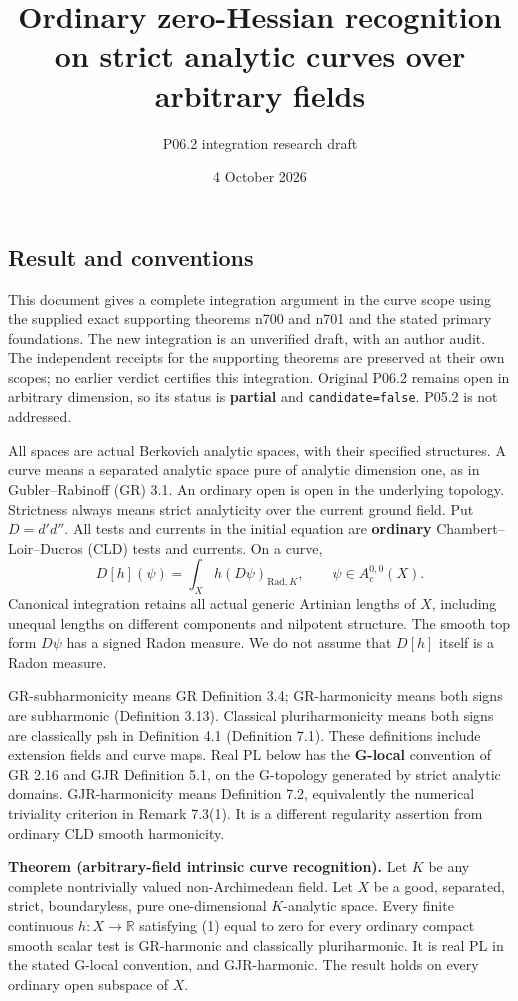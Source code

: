 \documentclass[
  11pt,
]{article}
\title{Ordinary zero-Hessian recognition on strict analytic curves over
arbitrary fields}
\author{P06.2 integration research draft}
\date{4 October 2026}
\begin{document}
\maketitle

\subsection{Result and conventions}\label{result-and-conventions}

This document gives a complete integration argument in the curve scope
using the supplied exact supporting theorems n700 and n701 and the
stated primary foundations. The new integration is an unverified draft,
with an author audit. The independent receipts for the supporting
theorems are preserved at their own scopes; no earlier verdict certifies
this integration. Original P06.2 remains open in arbitrary dimension, so
its status is \textbf{partial} and \texttt{candidate=false}. P05.2 is
not addressed.

All spaces are actual Berkovich analytic spaces, with their specified
structures. A curve means a separated analytic space pure of analytic
dimension one, as in Gubler--Rabinoff (GR) 3.1. An ordinary open is open
in the underlying topology. Strictness always means strict analyticity
over the current ground field. Put \(D=d'd''\). All tests and currents
in the initial equation are \textbf{ordinary} Chambert--Loir--Ducros
(CLD) tests and currents. On a curve, \[
 D[h](\psi)=\int_X h(D\psi)_{\mathrm{Rad},K},
 \qquad \psi\in A_c^{0,0}(X).                         \tag{1}
\] Canonical integration retains all actual generic Artinian lengths of
\(X\), including unequal lengths on different components and nilpotent
structure. The smooth top form \(D\psi\) has a signed Radon measure. We
do not assume that \(D[h]\) itself is a Radon measure.

GR-subharmonicity means GR Definition 3.4; GR-harmonicity means both
signs are subharmonic (Definition 3.13). Classical pluriharmonicity
means both signs are classically psh in Definition 4.1 (Definition 7.1).
These definitions include extension fields and curve maps. Real PL below
has the \textbf{G-local} convention of GR 2.16 and GJR Definition 5.1,
on the G-topology generated by strict analytic domains. GJR-harmonicity
means Definition 7.2, equivalently the numerical triviality criterion in
Remark 7.3(1). It is a different regularity assertion from ordinary CLD
smooth harmonicity.

\textbf{Theorem (arbitrary-field intrinsic curve recognition).} Let
\(K\) be any complete nontrivially valued non-Archimedean field. Let
\(X\) be a good, separated, strict, boundaryless, pure one-dimensional
\(K\)-analytic space. Every finite continuous \(h:X\to\mathbb R\)
satisfying (1) equal to zero for every ordinary compact smooth scalar
test is GR-harmonic and classically pluriharmonic. It is real PL in the
stated G-local convention, and GJR-harmonic. The result holds on every
ordinary open subspace of \(X\).
\end{document}
